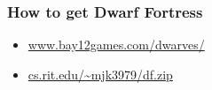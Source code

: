 \begin{frame}
\frametitle{How to get Dwarf Fortress}
\begin{itemize}
\item \url{www.bay12games.com/dwarves/}
\item \url{cs.rit.edu/~mjk3979/df.zip}
\end{itemize}
\end{frame}
